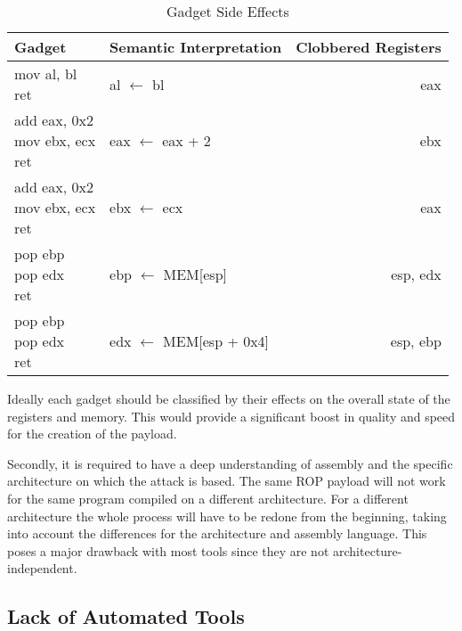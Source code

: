 \begin{table}
	\begin{center}
	\begin{tabular}{llr}
	\toprule
	\textbf{Gadget} & \textbf{Semantic Interpretation} & \textbf{Clobbered Registers} \\
	\midrule
	\shortstack[l]{mov al, bl \\ ret} & al $\leftarrow$ bl & eax \\
	\midrule
	\shortstack[l]{add eax, 0x2 \\ mov ebx, ecx \\ ret} & eax $\leftarrow$ eax + 2 & ebx \\
	\midrule
	\shortstack[l]{add eax, 0x2 \\ mov ebx, ecx \\ ret} & ebx $\leftarrow$ ecx & eax \\
	\midrule
	\shortstack[l]{pop ebp \\ pop edx \\ ret} & ebp $\leftarrow$ MEM[esp] & esp, edx \\
	\midrule
	\shortstack[l]{pop ebp \\ pop edx \\ ret} & edx $\leftarrow$ MEM[esp + 0x4] & esp, ebp \\
	\bottomrule
	\end{tabular}
	\caption{Gadget Side Effects}
	\label{table:sideEffects}
	\end{center}
\end{table}

Ideally each gadget should be classified by their effects on the overall state of the registers and memory. This would provide a significant boost in quality and speed for the creation of the payload.

Secondly, it is required to have a deep understanding of assembly and the specific architecture on which the attack is based. The same ROP payload will not work for the same program compiled on a different architecture. For a different architecture the whole process will have to be redone from the beginning, taking into account the differences for the architecture and assembly language. This poses a major drawback with most tools since they are not architecture-independent.

\subsection{Lack of Automated Tools}

